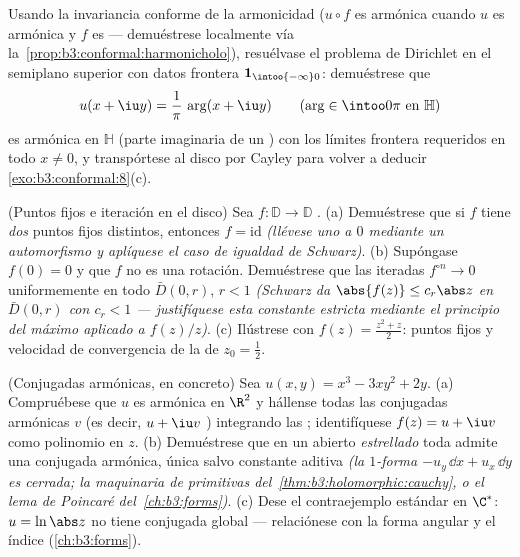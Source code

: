 \begin{exercise}[$\star\star$]\label{exo:b3:conformal:10}
Usando la invariancia conforme de la armonicidad ($u\circ f$ es armónica
cuando $u$ es armónica y $f$ es
 --- demuéstrese localmente
vía la~\cref{prop:b3:conformal:harmonicholo}), resuélvase el problema de
Dirichlet en el semiplano superior con datos frontera
$\mathbf 1_{\intoo{-\infty}0}$: demuéstrese que
\[
u(x + \iu y) = \frac1\pi\,\arg(x + \iu y)
\qquad (\arg \in \intoo0\pi \text{ en } \mathbb H)
\]
es armónica en $\mathbb H$ (parte imaginaria de un
) con los
límites frontera requeridos en todo $x \neq
0$, y transpórtese al disco por Cayley para volver a deducir
\cref{exo:b3:conformal:8}(c).
\end{exercise}

\begin{exercise}[$\star\star$]\label{exo:b3:conformal:11}
(Puntos fijos e iteración en el disco) Sea $f\colon\mathbb
D \to \mathbb D$ . (a)
Demuéstrese que si $f$ tiene \emph{dos} puntos fijos distintos, entonces
$f = \mathrm{id}$ \emph{(llévese uno a $0$ mediante un automorfismo y
aplíquese el caso de igualdad de Schwarz)}. (b) Supóngase $f(0) = 0$ y
que $f$ no es una rotación. Demuéstrese que las iteradas
$f^{\circ n} \to 0$ uniformemente en todo
 $\bar D(0, r)$, $r < 1$
\emph{(Schwarz da $\abs{f(z)}
\leq c_r\abs z$ en $\bar D(0,r)$ con $c_r < 1$ --- justifíquese esta
constante estricta mediante el principio del máximo aplicado a
$f(z)/z$)}.
(c) Ilústrese con $f(z) = \frac{z^2 + z}2$: puntos fijos y velocidad de
convergencia de la  de $z_0 =
\frac12$.
\end{exercise}

\begin{exercise}[$\star\star$]\label{exo:b3:conformal:12}
(Conjugadas armónicas, en concreto) Sea $u(x, y) = x^3 - 3xy^2
+ 2y$. (a) Compruébese que $u$ es armónica en $\R^2$ y hállense todas
las conjugadas armónicas $v$ (es decir, $u + \iu v$
) integrando las
; identifíquese $f(z) =
u + \iu v$ como polinomio en $z$. (b) Demuéstrese que en un
abierto \emph{estrellado} toda
 admite una
conjugada armónica, única salvo constante aditiva \emph{(la $1$-forma
$-u_y\,\dd x +
u_x\,\dd y$ es cerrada; la maquinaria de primitivas
del~\cref{thm:b3:holomorphic:cauchy}, o el lema de Poincaré
del~\cref{ch:b3:forms})}. (c) Dese el contraejemplo estándar en $\C^*$:
$u = \ln\abs z$ no tiene conjugada global --- relaciónese con la forma
angular y el índice
(\cref{ch:b3:forms}).
\end{exercise}

